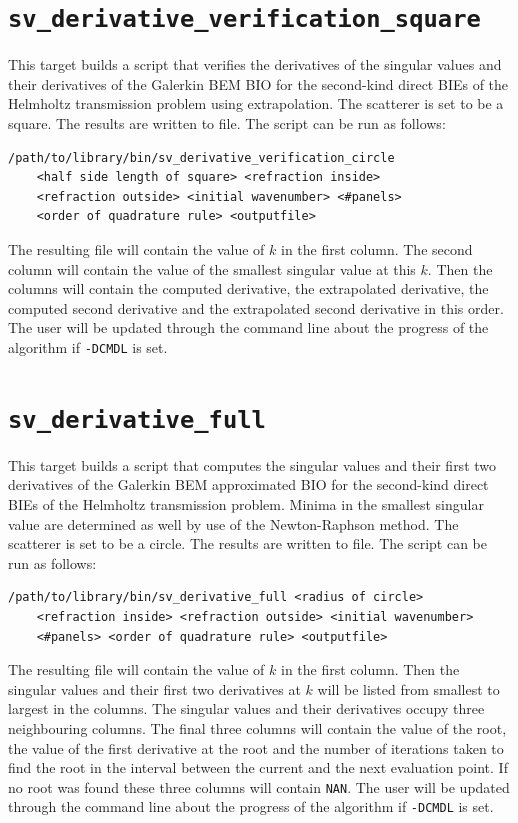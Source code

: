 \documentclass[a4paper, oneside]{thirdparty_stylesheets/discothesis}
\begin{document}
\cprotect\section{\verb|sv_derivative_verification_square|}
This target builds a script that verifies the derivatives of the singular
values and their derivatives of the Galerkin BEM BIO for the
second-kind direct BIEs of the Helmholtz transmission problem
using extrapolation.
The scatterer is set to be a square.
The results are written to file.
The script can be run as follows:
\begin{verbatim}
/path/to/library/bin/sv_derivative_verification_circle 
	<half side length of square> <refraction inside> 
	<refraction outside> <initial wavenumber> <#panels> 
	<order of quadrature rule> <outputfile>
\end{verbatim}
The resulting file will contain the value of $k$ in the first column.
The second column will contain the value of the smallest singular value at this $k$.
Then the columns will contain the computed derivative, the extrapolated derivative, the computed second derivative and the extrapolated second derivative in this order.
The user will be updated through the command line about the progress of the algorithm if \verb|-DCMDL| is set.

\cprotect\section{\verb|sv_derivative_full|}
This target builds a script that computes the singular values and
their first two derivatives of the Galerkin BEM
approximated BIO for the second-kind direct BIEs of the Helmholtz
transmission problem.
Minima in the smallest singular value are determined as well
by use of the Newton-Raphson method.
The scatterer is set to be a circle.
The results are written to file.
The script can be run as follows:
\begin{verbatim}
/path/to/library/bin/sv_derivative_full <radius of circle> 
	<refraction inside> <refraction outside> <initial wavenumber>
	<#panels> <order of quadrature rule> <outputfile>
\end{verbatim}
The resulting file will contain the value of $k$ in the first column.
Then the singular values and their first two derivatives at $k$ will be listed from smallest to largest in the columns.
The singular values and their derivatives occupy three neighbouring columns.
The final three columns will contain the value of the root, the value of the first derivative at the root and the number of iterations taken to find the root in the interval between the current and the next evaluation point.
If no root was found these three columns will contain \verb|NAN|.
The user will be updated through the command line about the progress of the algorithm if \verb|-DCMDL| is set.
\end{document}
